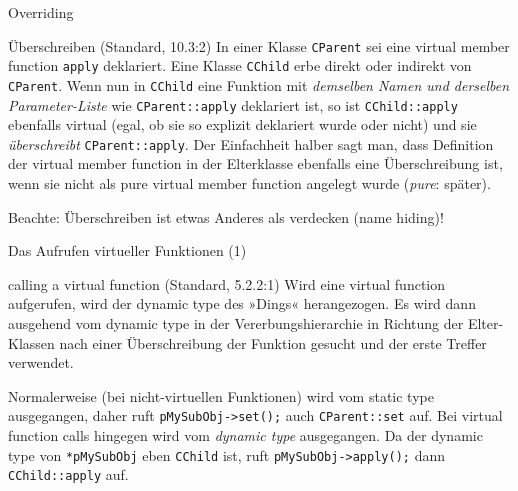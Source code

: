 \begin{frame}[fragile]{Overriding}
	\begin{block}{Überschreiben (Standard, 10.3:2)}
		In einer Klasse \verb|CParent| sei eine virtual member function \verb|apply| deklariert. Eine Klasse \verb|CChild| erbe direkt oder indirekt von \verb|CParent|. Wenn nun in \verb|CChild| eine Funktion mit \emph{demselben Namen und derselben Parameter-Liste} wie \verb|CParent::apply| deklariert ist, so ist \verb|CChild::apply| ebenfalls virtual (egal, ob sie so explizit deklariert wurde oder nicht) und sie \emph{überschreibt} \verb|CParent::apply|.
		Der Einfachheit halber sagt man, dass Definition der virtual member function in der Elterklasse ebenfalls eine Überschreibung ist, wenn sie nicht als pure virtual member function angelegt wurde (\emph{pure}: später).
	\end{block}
	
	\vspace{1em}
	
	Beachte: Überschreiben ist etwas Anderes als verdecken (name hiding)!
\end{frame}

\begin{frame}[fragile]{Das Aufrufen virtueller Funktionen (1)}
	\begin{block}{calling a virtual function (Standard, 5.2.2:1)}
		Wird eine virtual function aufgerufen, wird der dynamic type des »Dings« herangezogen. Es wird dann ausgehend vom dynamic type in der Vererbungshierarchie in Richtung der Elter-Klassen nach einer Überschreibung der Funktion gesucht und der erste Treffer verwendet.
	\end{block}
	
	\pause
	\vspace{1em}
	
	Normalerweise (bei nicht-virtuellen Funktionen) wird vom static type ausgegangen, daher ruft \verb|pMySubObj->set();| auch \verb|CParent::set| auf.
	\vspace{0.5em}
	Bei virtual function calls hingegen wird vom \emph{dynamic type} ausgegangen. Da der dynamic type von \verb|*pMySubObj| eben \verb|CChild| ist, ruft \verb|pMySubObj->apply();| dann \verb|CChild::apply| auf.
\end{frame}

